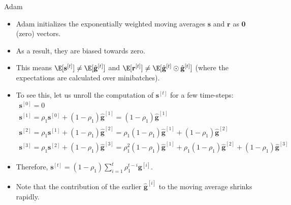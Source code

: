 \documentclass[11pt,compress,t,notes=noshow, xcolor=table]{beamer}
\begin{document}
\begin{vbframe}{Adam}
\begin{algorithm}[H]
\begin{algorithmic}[1]
    \EndWhile
  \end{algorithmic}
\end{algorithm}


\framebreak


\begin{itemize}
  \item Adam initializes the exponentially weighted moving averages $\mathbf{s}$ and $\mathbf{r}$ as $\mathbf{0}$ (zero) vectors.
  \item As a result, they are biased towards zero. 
  \item This means $\E[\mathbf{s}^{[t]}] \neq \E [\hat{\mathbf{g}}^{[t]}]$ and $\E[\mathbf{r}^{[t]}] \neq \E [\hat{\mathbf{g}}^{[t]} \odot \hat{\mathbf{g}}^{[t]}]$ (where the expectations are calculated over minibatches).
  \item To see this, let us unroll the computation of $\mathbf{s}^{[t]}$ for a few time-steps:
        \footnotesize
        \begin{gather*}
          \mathbf{s}^{[0]} = 0 \\
          \mathbf{s}^{[1]} = \rho_1\mathbf{s}^{[0]} + (1 - \rho_1) \hat{\mathbf{g}}^{[1]} = (1 - \rho_1) \hat{\mathbf{g}}^{[1]} \\
          \mathbf{s}^{[2]} = \rho_1\mathbf{s}^{[1]} + (1 - \rho_1) \hat{\mathbf{g}}^{[2]} = \rho_1 (1 - \rho_1) \hat{\mathbf{g}}^{[1]} + (1 - \rho_1) \hat{\mathbf{g}}^{[2]} \\
          \mathbf{s}^{[3]} = \rho_1\mathbf{s}^{[2]} + (1 - \rho_1) \hat{\mathbf{g}}^{[3]} = \rho_1^2 (1 - \rho_1) \hat{\mathbf{g}}^{[1]} + \rho_1 (1 - \rho_1) \hat{\mathbf{g}}^{[2]} + (1 - \rho_1) \hat{\mathbf{g}}^{[3]}
        \end{gather*}
        \normalsize
  \item Therefore, $\mathbf{s}^{[t]}  = (1 - \rho_1) \sum_{i=1}^t \rho_1^{t - i} \mathbf{g}^{[i]}$.
    \item Note that the contribution of the earlier $\hat{\mathbf{g}}^{[i]}$ to the moving average shrinks rapidly.
  \end{itemize}
  
  \framebreak
  

\end{vbframe}
\end{document}
